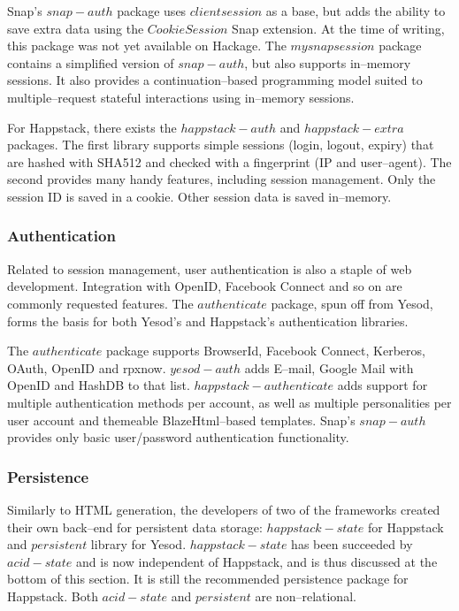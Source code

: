 Snap's $ snap-auth $ package uses $ clientsession $ as a base, but adds the ability to save extra data using the $ CookieSession $ Snap extension.
At the time of writing, this package was not yet available on Hackage.
The $ mysnapsession $ package contains a simplified version of $ snap-auth $, but also supports in--memory sessions. 
It also provides a continuation--based programming model suited to multiple--request stateful interactions using in--memory sessions.

For Happstack, there exists the $ happstack-auth $ and $ happstack-extra $ packages.
The first library supports simple sessions (login, logout, expiry) that are hashed with SHA512 and checked with a fingerprint (IP and user--agent).
The second provides many handy features, including session management. 
Only the session ID is saved in a cookie.
Other session data is saved in--memory.

\subsubsection{Authentication}

Related to session management, user authentication is also a staple of web development. 
Integration with OpenID, Facebook Connect and so on are commonly requested features.
The $ authenticate $ package, spun off from Yesod, forms the basis for both Yesod's and Happstack's authentication libraries.

The $ authenticate $ package supports BrowserId, Facebook Connect, Kerberos, OAuth, OpenID and rpxnow.
$ yesod-auth $ adds E--mail, Google Mail with OpenID and HashDB to that list.
$ happstack-authenticate $ adds support for multiple authentication methods per account, as well as multiple personalities per user account and themeable BlazeHtml--based templates.
Snap's $ snap-auth $ provides only basic user/password authentication functionality.

\subsubsection{Persistence}

Similarly to HTML generation, the developers of two of the frameworks created their own back--end for persistent data storage: $ happstack-state $ for Happstack and $ persistent $ library for Yesod.
$ happstack-state $ has been succeeded by $ acid-state $ and is now independent of Happstack, and is thus discussed at the bottom of this section.
It is still the recommended persistence package for Happstack.
Both $ acid-state $ and $ persistent $ are non--relational.

